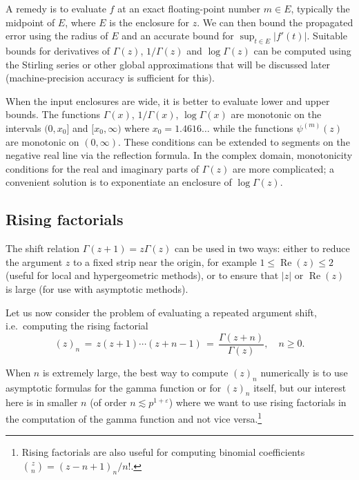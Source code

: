 \documentclass[reqno]{amsart}
\theoremstyle{definition}
\begin{document}
A remedy is to evaluate $f$ at an exact
floating-point number $m \in E$, typically the midpoint of $E$, where $E$ is the enclosure for $z$.
We can then bound the propagated error using the radius of $E$
and an accurate bound for $\sup_{t \in E} |f'(t)|$.
Suitable bounds for derivatives of $\Gamma(z)$, $1/\Gamma(z)$ and $\log \Gamma(z)$
can be computed using the Stirling series or
other global approximations that will be discussed later (machine-precision
accuracy is sufficient for this).

When the input enclosures are wide, it is better to evaluate
lower and upper bounds.
The functions $\Gamma(x)$, $1/\Gamma(x)$, $\log \Gamma(x)$
are monotonic on the intervals $(0, x_0]$ and $[x_0, \infty)$
where $x_0 = 1.4616\ldots$ while the functions $\psi^{(m)}(z)$
are monotonic on $(0, \infty)$.
These conditions can be extended to segments on the negative real line
via the reflection formula.
In the complex domain, monotonicity conditions for
the real and imaginary parts of $\Gamma(z)$ are more complicated;
a convenient solution
is to exponentiate an enclosure of $\log \Gamma(z)$.

\subsection{Rising factorials}

\label{sect:rising}

The shift relation $\Gamma(z+1) = z \Gamma(z)$ can be used in two ways:
either to reduce the argument $z$ to a fixed strip near the origin,
for example $1 \le \operatorname{Re}(z) \le 2$ (useful for local and hypergeometric methods),
or to ensure that $|z|$ or $\operatorname{Re}(z)$ is large (for use with asymptotic methods).

Let us now consider the problem of evaluating a repeated argument
shift, i.e.\ computing the rising factorial
\begin{equation}
(z)_n \,=\, z (z+1) \cdots (z+n-1) \,=\, \frac{\Gamma(z+n)}{\Gamma(z)}, \quad n \ge 0.
\end{equation}

When $n$ is extremely large, the best way to compute $(z)_n$ numerically is to
use asymptotic formulas for the gamma function or for $(z)_n$ itself,
but our interest here is in smaller $n$ (of order $n \lesssim p^{1+\varepsilon}$) where we want to use rising factorials
in the computation of the gamma function and not vice versa.\footnote{Rising factorials
are also useful for computing binomial coefficients ${z \choose n} = (z-n+1)_n / n!$.}
\end{document}
